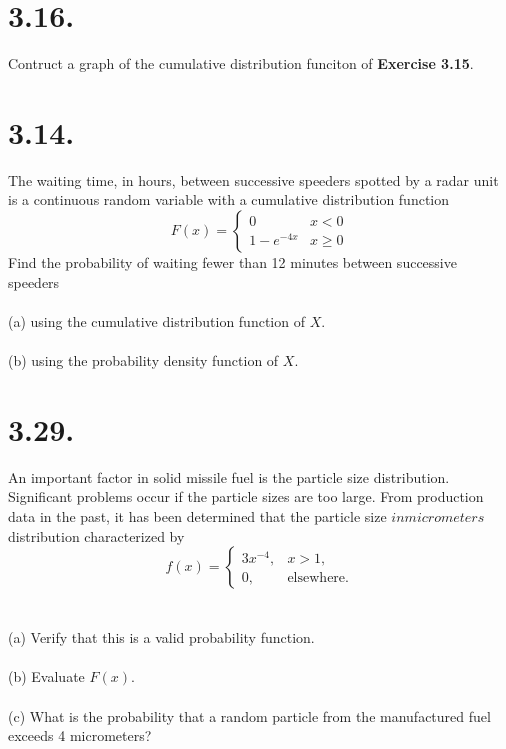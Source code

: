 \documentclass[../main.tex]{subfiles}
\begin{document}
\vspace{15em}

\section{3.16.}
Contruct a graph of the cumulative distribution funciton of \textbf{Exercise 3.15}.

\vspace{23em}

\section{3.14.}
The waiting time, in hours, between successive speeders spotted by a radar unit is a
continuous random variable with a cumulative distribution function
$$
F(x)=
\begin{cases}
0 & x<0 \\
1-e^{-4x} & x\geq 0
\end{cases}
$$
Find the probability of waiting fewer than 12 minutes between 
successive speeders
\\\\
(a) using the cumulative distribution function of $X$.
\\\\
(b) using the probability density function of $X$. 

\vspace{23em}

\section{3.29.}
An important factor in solid missile fuel is the particle size distribution.
Significant problems occur if the particle sizes are too large. From production data 
in the past, it has been determined that the particle size \(in micrometers\) distribution 
characterized by
$$
f(x)=
\begin{cases}
3x^{-4}, & x>1, \\
0, & \text{elsewhere}.
\end{cases}
$$
\\\\
(a) Verify that this is a valid probability function.
\\\\
(b) Evaluate $F(x)$.
\\\\
(c) What is the probability that a random particle from
the manufactured fuel exceeds 4 micrometers?
\end{document}
